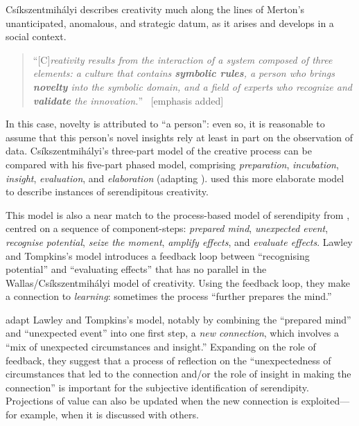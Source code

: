 Cs\'ikszentmih\'alyi describes creativity much along the lines of
Merton's unanticipated, anomalous, and strategic datum, as it arises
and develops in a social context.

\begin{quote}
``{[}C{]}\emph{reativity results from the interaction of a system
    composed of three elements: a culture that contains
   \emph{\textbf{symbolic rules}}, a person who brings
    \emph{\textbf{novelty}} into the symbolic domain, and a
    field of experts who recognize and
    \emph{\textbf{validate}} the innovation.}''
  \cite[p.~6]{csikszentmihalyi1997flow}~{[}emphasis added{]}
\end{quote}

In this case, novelty is attributed to ``a person'': even so, it is
reasonable to assume that this person's novel insights rely at least
in part on the observation of data.
Cs\'ikszentmih\'alyi's three-part model of the creative process can be
compared with his five-part phased model, comprising
\emph{preparation}, \emph{incubation}, \emph{insight},
\emph{evaluation}, and \emph{elaboration}
\cite[pp.~79--80]{csikszentmihalyi1997flow} (adapting
\citet{wallas1926art}).  \citet{Campos2002} used this more elaborate
model to describe instances of serendipitous creativity.

This model is also a near match to the process-based model of
serendipity from \citet{lawley2008maximising}, centred on a sequence
of component-steps: \emph{prepared mind}, \emph{unexpected event},
\emph{recognise potential}, \emph{seize the moment}, \emph{amplify
  effects}, and \emph{evaluate effects}.  Lawley and Tompkins's model
introduces a feedback loop between ``recognising potential'' and
``evaluating effects'' that has no parallel in the
Wallas/Cs\'ikszentmih\'alyi model of creativity.  Using the feedback
loop, they make a connection to \emph{learning}: sometimes the process
``further prepares the mind.''

 adapt Lawley and Tompkins's model, notably by
combining the ``prepared mind'' and ``unexpected event'' into one
first step, a \emph{new connection}, which involves a ``mix of
unexpected circumstances and insight.''  Expanding on the role of
feedback, they suggest that a process of reflection on the
``unexpectedness of circumstances that led to the connection and/or
the role of insight in making the connection'' is important for the
subjective identification of serendipity.  Projections of value can
also be updated when the new connection is exploited---for example,
when it is discussed with others.

